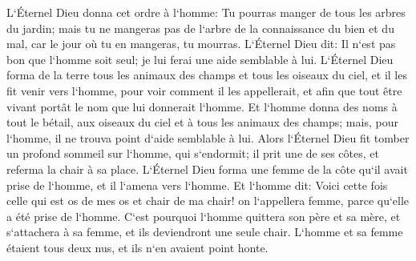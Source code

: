 \verse L`Éternel Dieu donna cet ordre à l`homme: Tu pourras manger de tous les arbres du jardin; 
\verse mais tu ne mangeras pas de l`arbre de la connaissance du bien et du mal, car le jour où tu en mangeras, tu mourras. 
\verse L`Éternel Dieu dit: Il n`est pas bon que l`homme soit seul; je lui ferai une aide semblable à lui. 
\verse L`Éternel Dieu forma de la terre tous les animaux des champs et tous les oiseaux du ciel, et il les fit venir vers l`homme, pour voir comment il les appellerait, et afin que tout être vivant portât le nom que lui donnerait l`homme. 
\verse Et l`homme donna des noms à tout le bétail, aux oiseaux du ciel et à tous les animaux des champs; mais, pour l`homme, il ne trouva point d`aide semblable à lui. 
\verse Alors l`Éternel Dieu fit tomber un profond sommeil sur l`homme, qui s`endormit; il prit une de ses côtes, et referma la chair à sa place. 
\verse L`Éternel Dieu forma une femme de la côte qu`il avait prise de l`homme, et il l`amena vers l`homme. 
\verse Et l`homme dit: Voici cette fois celle qui est os de mes os et chair de ma chair! on l`appellera femme, parce qu`elle a été prise de l`homme. 
\verse C`est pourquoi l`homme quittera son père et sa mère, et s`attachera à sa femme, et ils deviendront une seule chair. 
\verse L`homme et sa femme étaient tous deux nus, et ils n`en avaient point honte. 

